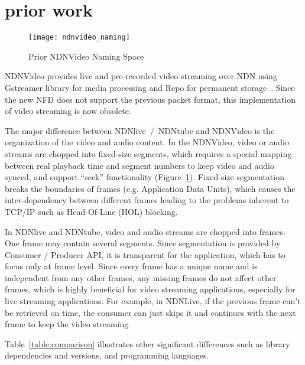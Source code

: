 \section{prior work} %
\label{sec:comparison}
\begin{figure}%
  \centering
  \texttt{[image: ndnvideo\_naming]}
  \vspace{-0.3cm}
  \caption{Prior NDNVideo Naming Space}
  \label{fig:ndnvideo_naming}
  \vspace{-0.2cm}
\end{figure}

NDNVideo provides live and pre-recorded video streaming over NDN using Gstreamer library for media processing and Repo for permanent storage~\cite{ndnvideo}. Since the new NFD does not support the previous packet format, this implementation of video streaming is now obsolete.

The major difference between NDNlive~/~NDNtube and NDNVideo is the organization of the video and audio content. In the NDNVideo, video or audio streams are chopped into fixed-size segments, which requires a special mapping between real playback time and segment numbers to keep video and audio synced, and support ``seek'' functionality (Figure~\ref{fig:ndnvideo_naming}). Fixed-size segmentation breaks the boundaries of frames (e.g. Application Data Units), which causes the inter-dependency between different frames leading to the problems inherent to TCP/IP such as Head-Of-Line (HOL) blocking.

In NDNlive and NDNtube, video and audio streams are chopped into frames. One frame may contain several segments. Since segmentation is provided by Consumer / Producer API, it is transparent for the application, which has to focus only at frame level. Since every frame has a unique name and is independent from any other frames, any missing frames do not affect other frames, which is highly beneficial for video streaming applications, especially for live streaming applications. For example, in NDNLive, if the previous frame can't be retrieved on time, the consumer can just skips it and continues with the next frame to keep the video streaming. 

Table~\ref{table:comparison} illustrates other significant differences such as library dependencies and versions, and programming languages.

